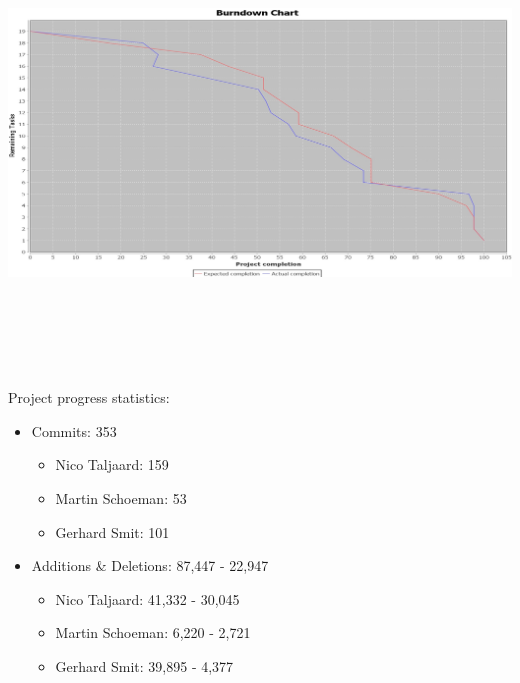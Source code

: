\documentclass[letterpaper]{article}
\begin{document}
		\begin{minipage}{\textwidth}
			\begin{flushleft}
				\includegraphics[width=\textwidth,height=120mm]{UML_Diagram/Burndown_Chart.jpg}
			\end{flushleft}
		\end{minipage}
		
		Project progress statistics:
		\begin{itemize}
			\item Commits: 353
				\begin{itemize}
					\item Nico Taljaard: 159
					\item Martin Schoeman: 53
					\item Gerhard Smit: 101
				\end{itemize}
			\item Additions \& Deletions: 87,447 - 22,947
				\begin{itemize}
					\item Nico Taljaard: 41,332 - 30,045
					\item Martin Schoeman: 6,220 - 2,721
					\item Gerhard Smit: 39,895 - 4,377
				\end{itemize}
		\end{itemize}
		
		\newpage
		
		\vspace{0.2in}
\end{document}

